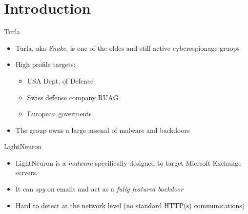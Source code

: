 \section{Introduction}

\begin{frame}[fragile]{Turla}
    \begin{itemize}
      \item Turla, aka \emph{Snake}, is one of the oldes and still active cyberespionage gruops \cite{Turla19}   
      \item High profile targets:
      \begin{itemize}
        \item[] USA Dept. of Defence
        \item[] Swiss defense company RUAG
        \item[] European goverments
      \end{itemize}
      \item The group owns a large arsenal of malware and backdoors
    \end{itemize}
\end{frame} 

\begin{frame}[fragile]{LightNeuron}
  \begin{itemize}
    \item LightNeuron is a \emph{malware} specifically designed to target Micrsoft Exchange servers.
    \item It can \emph{spy} on emails and act as a \emph{fully featured backdoor}
    \item Hard to detect at the network level (no standard HTTP(s) communications)
  \end{itemize}
\end{frame}